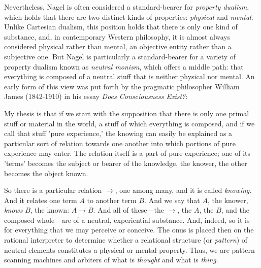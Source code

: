 \begin{tcolorbox}[breakable, enhanced, colback=textbook-blue, sharp corners]
	Nevertheless, Nagel is often considered a standard-bearer for \textit{property dualism}, which holds that there are two distinct kinds of properties: \textit{physical} and \textit{mental}. Unlike Cartesian dualism, this position holds that there is only one kind of substance, and, in contemporary Western philosophy, it is almost always considered physical rather than mental, an objective entity rather than a subjective one. But Nagel is particularly a standard-bearer for a variety of property dualism known as \textit{neutral monism}, which offers a middle path: that everything is composed of a neutral stuff that is neither physical nor mental. An early form of this view was put forth by the pragmatic philosopher William James (1842-1910) in his essay \textit{Does Consciousness Exist?}: \\
	
	\begin{displayquote}
		My thesis is that if we start with the supposition that there is only one primal stuff or material in the world, a stuff of which everything is composed, and if we call that stuff 'pure experience,' the knowing can easily be explained as a particular sort of relation towards one another into which portions of pure experience may enter. The relation itself is a part of pure experience; one of its 'terms' becomes the subject or bearer of the knowledge, the knower, the other becomes the object known. \\
	\end{displayquote}
	
	So there is a particular relation $\rightarrow$, one among many, and it is called \textit{knowing}. And it relates one term $A$ to another term $B$. And we say that $A$, the knower, \textit{knows} $B$, the known: $A \rightarrow B$. And all of these---the $\rightarrow$, the $A$, the $B$, and the composed whole---are of a neutral, experiential substance. And, indeed, so it is for everything that we may perceive or conceive. The onus is placed then on the rational interpreter to determine whether a relational structure (or \textit{pattern}) of neutral elements constitutes a physical or mental property. Thus, we are pattern-scanning machines and arbiters of what is \textit{thought} and what is \textit{thing}. \\
	
	

\end{tcolorbox}
